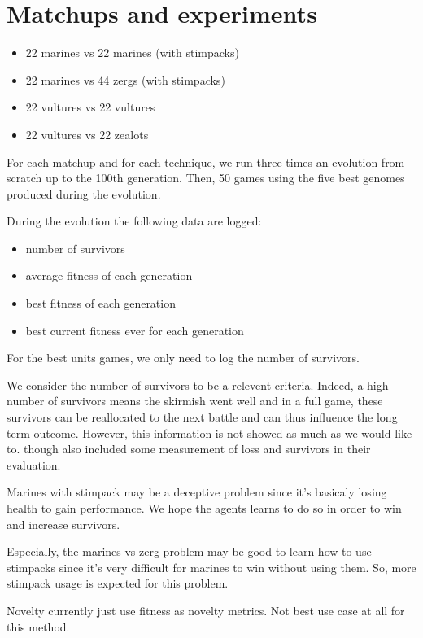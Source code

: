 \section{Matchups and experiments}

\begin{itemize}
    \item 22 marines vs 22 marines (with stimpacks)
    \item 22 marines vs 44 zergs (with stimpacks)
    \item 22 vultures vs 22 vultures
    \item 22 vultures vs 22 zealots
\end{itemize}

For each matchup and for each technique, we run three times an evolution from scratch up to the 100th generation.
Then, 50 games using the five best genomes produced during the evolution.

During the evolution the following data are logged:
\begin{itemize}
    \item number of survivors
    \item average fitness of each generation
    \item best fitness of each generation
    \item best current fitness ever for each generation
\end{itemize}

For the best units games, we only need to log the number of survivors.

We consider the number of survivors to be a relevent criteria. Indeed, a high number of survivors means the skirmish went well
and in a full game, these survivors can be reallocated to the next battle and can thus influence the long term outcome.
However, this information is not showed as much as we would like to. \citet{SiSuBa14} though also included some measurement of loss
and survivors in their evaluation.

Marines with stimpack may be a deceptive problem since it's basicaly losing health to gain performance.
We hope the agents learns to do so in order to win and increase survivors.

Especially, the marines vs zerg problem may be good to learn how to use stimpacks since it’s very difficult
for marines to win without using them. So, more stimpack usage is expected for this problem.

Novelty currently just use fitness as novelty metrics. Not best use case at all for this method.

